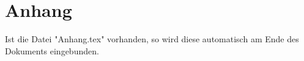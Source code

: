 \section{Anhang}

Ist die Datei "Anhang.tex" vorhanden, so wird diese automatisch am Ende des Dokuments eingebunden.